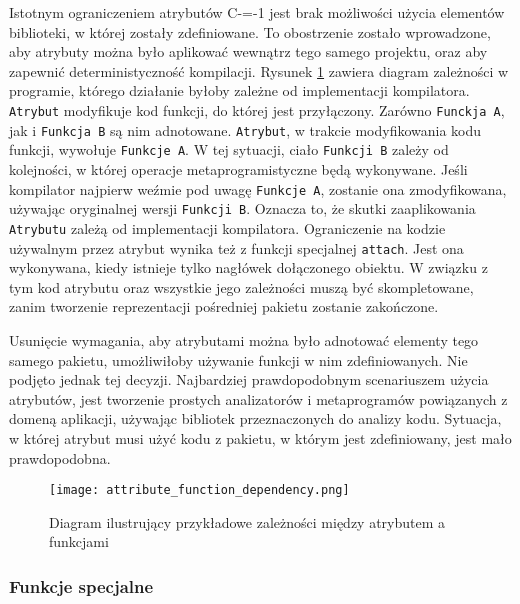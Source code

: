 Istotnym ograniczeniem atrybutów C-=-1 jest brak możliwości użycia elementów biblioteki, w której zostały zdefiniowane.
To obostrzenie zostało wprowadzone, aby atrybuty można było aplikować wewnątrz tego samego projektu, oraz aby zapewnić deterministyczność kompilacji.
Rysunek \ref{design:attributes:attribute_function_dependendcy} zawiera diagram zależności w programie, którego działanie byłoby zależne od implementacji kompilatora.
\lstinline{Atrybut} modyfikuje kod funkcji, do której jest przyłączony.
Zarówno \lstinline{Funckja A}, jak i \lstinline{Funkcja B} są nim adnotowane.
\lstinline{Atrybut}, w trakcie modyfikowania kodu funkcji, wywołuje \lstinline{Funkcje A}.
W tej sytuacji, ciało \lstinline{Funkcji B} zależy od kolejności, w której operacje metaprogramistyczne będą wykonywane.
Jeśli kompilator najpierw weźmie pod uwagę \lstinline{Funkcje A}, zostanie ona zmodyfikowana, używając oryginalnej wersji \lstinline{Funkcji B}.
Oznacza to, że skutki zaaplikowania \lstinline{Atrybutu} zależą od implementacji kompilatora.
Ograniczenie na kodzie używalnym przez atrybut wynika też z funkcji specjalnej \lstinline{attach}.
Jest ona wykonywana, kiedy istnieje tylko nagłówek dołączonego obiektu.
W związku z tym kod atrybutu oraz wszystkie jego zależności muszą być skompletowane, zanim tworzenie reprezentacji pośredniej pakietu zostanie zakończone.

Usunięcie wymagania, aby atrybutami można było adnotować elementy tego samego pakietu, umożliwiłoby używanie funkcji w nim zdefiniowanych.
Nie podjęto jednak tej decyzji.
Najbardziej prawdopodobnym scenariuszem użycia atrybutów, jest tworzenie prostych analizatorów i metaprogramów powiązanych z domeną aplikacji, używając bibliotek przeznaczonych do analizy kodu.
Sytuacja, w której atrybut musi użyć kodu z pakietu, w którym jest zdefiniowany, jest mało prawdopodobna.

\begin{figure}
	\caption{Diagram ilustrujący przykładowe zależności między atrybutem a funkcjami}
	\label{design:attributes:attribute_function_dependendcy}
	\centering
	\texttt{[image: attribute\_function\_dependency.png]}
\end{figure}

\subsubsection{Funkcje specjalne}
\label{design:attributes:special_functions}

